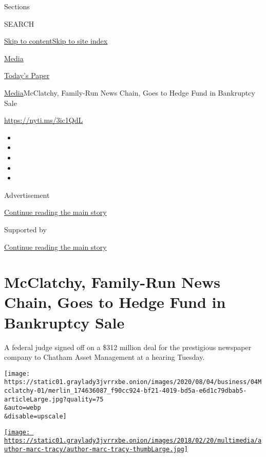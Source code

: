 Sections

SEARCH

\protect\hyperlink{site-content}{Skip to
content}\protect\hyperlink{site-index}{Skip to site index}

\href{https://www.nytimes3xbfgragh.onion/section/business/media}{Media}

\href{https://myaccount.nytimes3xbfgragh.onion/auth/login?response_type=cookie\&client_id=vi}{}

\href{https://www.nytimes3xbfgragh.onion/section/todayspaper}{Today's
Paper}

\href{/section/business/media}{Media}\textbar{}McClatchy, Family-Run
News Chain, Goes to Hedge Fund in Bankruptcy Sale

\url{https://nyti.ms/3ic1QdL}

\begin{itemize}
\item
\item
\item
\item
\item
\end{itemize}

Advertisement

\protect\hyperlink{after-top}{Continue reading the main story}

Supported by

\protect\hyperlink{after-sponsor}{Continue reading the main story}

\hypertarget{mcclatchy-family-run-news-chain-goes-to-hedge-fund-in-bankruptcy-sale}{%
\section{McClatchy, Family-Run News Chain, Goes to Hedge Fund in
Bankruptcy
Sale}\label{mcclatchy-family-run-news-chain-goes-to-hedge-fund-in-bankruptcy-sale}}

A federal judge signed off on a \$312 million deal for the prestigious
newspaper company to Chatham Asset Management at a hearing Tuesday.

\texttt{[image: https://static01.graylady3jvrrxbe.onion/images/2020/08/04/business/04Mcclatchy-01/merlin\_174636087\_f90cc924-bf21-4019-bd5a-e6d1c79dbab5-articleLarge.jpg?quality=75\\\&auto=webp\\\&disable=upscale]}

\href{https://www.nytimes3xbfgragh.onion/by/marc-tracy}{\texttt{[image: https://static01.graylady3jvrrxbe.onion/images/2018/02/20/multimedia/author-marc-tracy/author-marc-tracy-thumbLarge.jpg]}}

